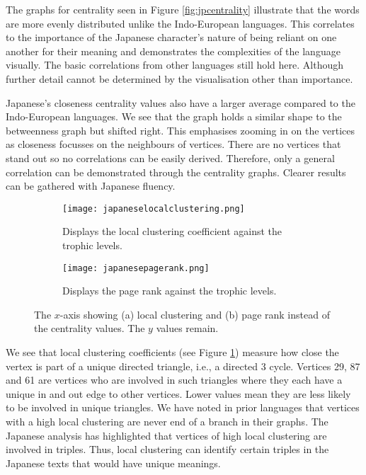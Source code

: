 The graphs for centrality seen in Figure \ref{fig:jpcentrality} illustrate that the words are more evenly distributed unlike the Indo-European languages. This correlates to the importance of the Japanese character's nature of being reliant on one another for their meaning and demonstrates the complexities of the language visually. The basic correlations from other languages still hold here. Although further detail cannot be determined by the visualisation other than importance. 

Japanese's closeness centrality values also have a larger average compared to the Indo-European languages. We see that the graph holds a similar shape to the betweenness graph but shifted right. This emphasises zooming in on the vertices as closeness focusses on the neighbours of vertices. There are no vertices that stand out so no correlations can be easily derived. Therefore, only a general correlation can be demonstrated through the centrality graphs. Clearer results can be gathered with Japanese fluency.

\begin{figure}[!htb]
\centering
\begin{subfigure}{.45\textwidth}
	\hspace{-1cm} 
	\texttt{[image: japaneselocalclustering.png]}
	\caption{Displays the local clustering coefficient against the trophic levels.}
	\label{fig:jplc}
\end{subfigure}
\hfill
\begin{subfigure}{.45\textwidth}
	\hspace{-1cm} 
	\texttt{[image: japanesepagerank.png]}
	\caption{Displays the page rank against the trophic levels.}
	\label{fig:jppr}
\end{subfigure}
\caption{The $x$-axis showing (a) local clustering and (b) page rank instead of the centrality values. The $y$ values remain.}
\label{fig:jpother}
\end{figure}

We see that local clustering coefficients (see Figure \ref{fig:jplc}) measure how close the vertex is part of a unique directed triangle, i.e., a directed 3 cycle. Vertices 29, 87 and 61 are vertices who are involved in such triangles where they each have a unique in and out edge to other vertices. Lower values mean they are less likely to be involved in unique triangles. We have noted in prior languages that vertices with a high local clustering are never end of a branch in their graphs. The Japanese analysis has highlighted that vertices of high local clustering are involved in triples. Thus, local clustering can identify certain triples in the Japanese texts that would have unique meanings.

